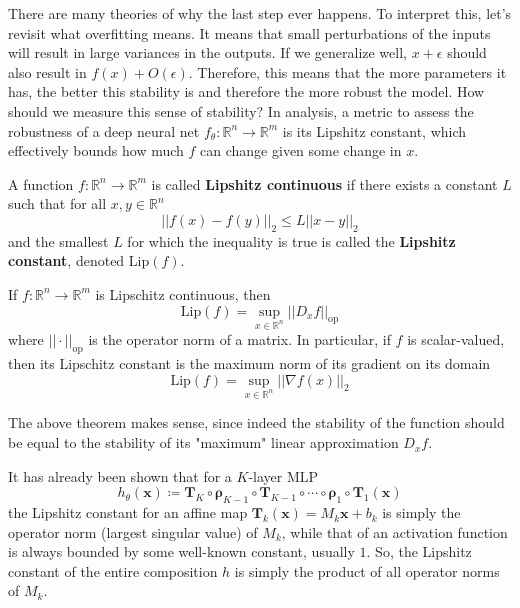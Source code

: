   There are many theories of why the last step ever happens. To interpret this, let's revisit what overfitting means. It means that small perturbations of the inputs will result in large variances in the outputs. If we generalize well, $x + \epsilon$ should also result in $f(x) + O(\epsilon)$. Therefore, this means that the more parameters it has, the better this stability is and therefore the more robust the model. How should we measure this sense of stability? In analysis, a metric to assess the robustness of a deep neural net $f_\theta: \mathbb{R}^n \longrightarrow \mathbb{R}^m$ is its Lipshitz constant, which effectively bounds how much $f$ can change given some change in $x$. 

  \begin{definition}
    A function $f: \mathbb{R}^n \longrightarrow \mathbb{R}^m$ is called \textbf{Lipshitz continuous} if there exists a constant $L$ such that for all $x, y \in \mathbb{R}^n$
    \begin{equation}
      ||f(x) - f(y)||_2 \leq L ||x - y||_2
    \end{equation}
    and the smallest $L$ for which the inequality is true is called the \textbf{Lipshitz constant}, denoted $\mathrm{Lip}(f)$. 
  \end{definition}

  \begin{theorem}
    If $f: \mathbb{R}^n \longrightarrow \mathbb{R}^m$ is Lipschitz continuous, then 
    \begin{equation}
      \mathrm{Lip}(f) = \sup_{x \in \mathbb{R}^n} ||D_x f||_{\mathrm{op}}
    \end{equation}
    where $||\cdot ||_{\mathrm{op}}$ is the operator norm of a matrix. In particular, if $f$ is scalar-valued, then its Lipschitz constant is the maximum norm of its gradient on its domain 
    \begin{equation}
      \mathrm{Lip}(f) = \sup_{x \in \mathbb{R}^n} ||\nabla f(x)||_2
    \end{equation}
  \end{theorem}

  The above theorem makes sense, since indeed the stability of the function should be equal to the stability of its "maximum" linear approximation $D_x f$. 

  \begin{theorem}
    It has already been shown that for a $K$-layer MLP
    \begin{equation}
      h_\theta (\mathbf{x}) \coloneqq \mathbf{T}_K \circ \boldsymbol{\rho}_{K-1} \circ \mathbf{T}_{K-1} \circ \cdots \circ \boldsymbol{\rho}_1 \circ \mathbf{T}_1 (\mathbf{x})
    \end{equation}
    the Lipshitz constant for an affine map $\mathbf{T}_k (\mathbf{x}) = M_k \mathbf{x} + b_k$ is simply the operator norm (largest singular value) of $M_k$, while that of an activation function is always bounded by some well-known constant, usually $1$. So, the Lipshitz constant of the entire composition $h$ is simply the product of all operator norms of $M_k$. 
  \end{theorem}

